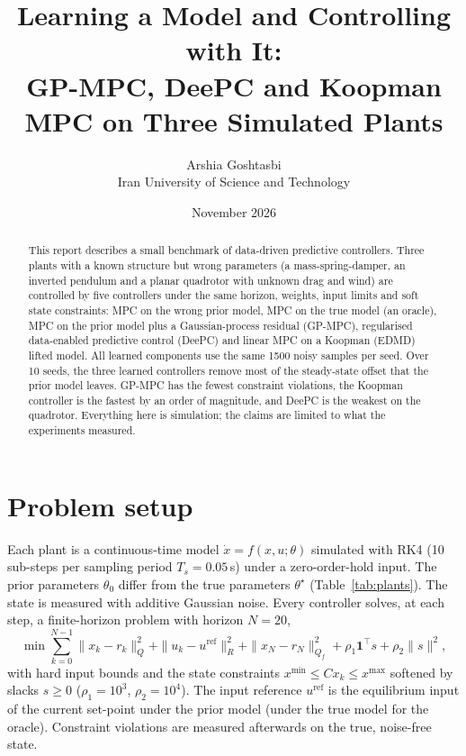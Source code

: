 \documentclass[11pt,a4paper]{article}
\title{Learning a Model and Controlling with It:\\
GP-MPC, DeePC and Koopman MPC on Three Simulated Plants}
\author{Arshia Goshtasbi\\Iran University of Science and Technology}
\date{November 2026}
\begin{document}
\maketitle

\begin{abstract}
This report describes a small benchmark of data-driven predictive controllers.
Three plants with a known structure but wrong parameters (a mass-spring-damper,
an inverted pendulum and a planar quadrotor with unknown drag and wind) are
controlled by five controllers under the same horizon, weights, input limits and
soft state constraints: MPC on the wrong prior model, MPC on the true model (an
oracle), MPC on the prior model plus a Gaussian-process residual (GP-MPC),
regularised data-enabled predictive control (DeePC) and linear MPC on a
Koopman (EDMD) lifted model. All learned components use the same 1500
noisy samples per seed. Over 10 seeds, the three learned controllers remove
most of the steady-state offset that the prior model leaves. GP-MPC has the
fewest constraint violations, the Koopman controller is the fastest by an
order of magnitude, and DeePC is the weakest on the quadrotor. Everything here is simulation; the claims are
limited to what the experiments measured.
\end{abstract}

\section{Problem setup}
Each plant is a continuous-time model $\dot x = f(x,u;\theta)$ simulated with
RK4 (10 sub-steps per sampling period $T_s = 0.05$\,s) under a zero-order-hold
input. The prior parameters $\theta_0$ differ from the true parameters
$\theta^\star$ (Table~\ref{tab:plants}). The state is measured with additive
Gaussian noise. Every controller solves, at each step, a finite-horizon problem
with horizon $N=20$,
\begin{equation}
\min \sum_{k=0}^{N-1} \|x_k-r_k\|_Q^2 + \|u_k-u^{\mathrm{ref}}\|_R^2 + \|x_N-r_N\|_{Q_f}^2
+ \rho_1 \mathbf{1}^\top s + \rho_2\|s\|^2,
\end{equation}
with hard input bounds and the state constraints $x^{\min}\le Cx_k\le x^{\max}$
softened by slacks $s\ge 0$ ($\rho_1=10^3$, $\rho_2=10^4$). The input reference
$u^{\mathrm{ref}}$ is the equilibrium input of the current set-point under the
prior model (under the true model for the oracle). Constraint violations are
measured afterwards on the true, noise-free state.
\end{document}
